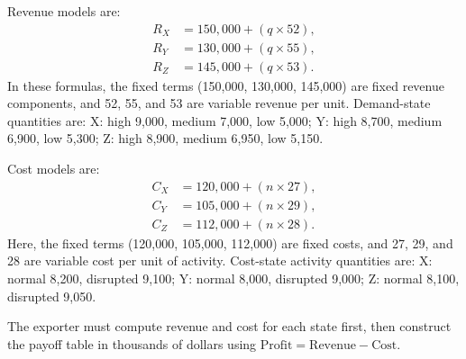 \begin{ExamProblems}
		Revenue models are:
		\[
		\begin{aligned}
		R_X &= 150{,}000 + (q\times52),\\
		R_Y &= 130{,}000 + (q\times55),\\
		R_Z &= 145{,}000 + (q\times53).
		\end{aligned}
		\]
		In these formulas, the fixed terms (150{,}000, 130{,}000, 145{,}000) are fixed revenue components, and 52, 55, and 53 are variable revenue per unit.
		Demand-state quantities are:
		X: high 9{,}000, medium 7{,}000, low 5{,}000;
		Y: high 8{,}700, medium 6{,}900, low 5{,}300;
		Z: high 8{,}900, medium 6{,}950, low 5{,}150.
		
		Cost models are:
		\[
		\begin{aligned}
		C_X &= 120{,}000 + (n\times27),\\
		C_Y &= 105{,}000 + (n\times29),\\
		C_Z &= 112{,}000 + (n\times28).
		\end{aligned}
		\]
		Here, the fixed terms (120{,}000, 105{,}000, 112{,}000) are fixed costs, and 27, 29, and 28 are variable cost per unit of activity.
		Cost-state activity quantities are:
		X: normal 8{,}200, disrupted 9{,}100;
		Y: normal 8{,}000, disrupted 9{,}000;
		Z: normal 8{,}100, disrupted 9{,}050.
		
		The exporter must compute revenue and cost for each state first, then construct the payoff table in thousands of dollars using
		\(\text{Profit}=\text{Revenue}-\text{Cost}\).

\end{ExamProblems}

